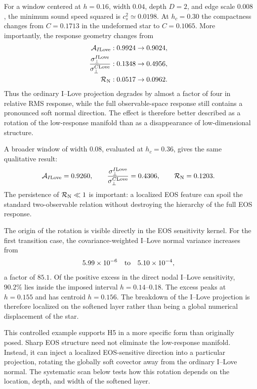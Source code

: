 For a window centered at \(h=0.16\), width \(0.04\), depth \(D=2\), and
edge scale \(0.008\), the minimum sound speed squared is
\(c_s^2\simeq0.0198\).  At \(h_c=0.30\) the compactness changes from
\(C=0.1713\) in the undeformed star to \(C=0.1065\).  More importantly, the
response geometry changes from
\begin{align}
 {\cal A}_{I{\rm Love}}
 &:
 0.9924\rightarrow0.9024,
 \\
 \frac{\sigma_\perp^{I{\rm Love}}}
      {\sigma_\perp^{C{\rm Love}}}
 &:
 0.1348\rightarrow0.4956,
 \\
 \mathcal R_{\rm N}
 &:
 0.0517\rightarrow0.0962.
 \label{eq:transition-rotation}
\end{align}
Thus the ordinary I--Love projection degrades by almost a factor of four in
relative RMS response, while the full observable-space response still
contains a pronounced soft normal direction.  The effect is therefore better
described as a rotation of the low-response manifold than as a disappearance
of low-dimensional structure.

A broader window of width \(0.08\), evaluated at \(h_c=0.36\), gives the same
qualitative result:
\[
 {\cal A}_{I{\rm Love}}=0.9260,
 \qquad
 \frac{\sigma_\perp^{I{\rm Love}}}
      {\sigma_\perp^{C{\rm Love}}}=0.4306,
 \qquad
 \mathcal R_{\rm N}=0.1203.
\]
The persistence of \(\mathcal R_{\rm N}\ll1\) is important: a localized EOS
feature can spoil the standard two-observable relation without destroying
the hierarchy of the full EOS response.

The origin of the rotation is visible directly in the EOS sensitivity
kernel.  For the first transition case, the covariance-weighted I--Love
normal variance increases from
\[
 5.99\times10^{-6}
 \quad\hbox{to}\quad
 5.10\times10^{-4},
\]
a factor of \(85.1\).  Of the positive excess in the direct nodal
I--Love sensitivity, \(90.2\%\) lies inside the imposed interval
\(h=0.14\)--0.18.  The excess peaks at \(h=0.155\) and has centroid
\(h=0.156\).  The breakdown of the I--Love projection is therefore localized
on the softened layer rather than being a global numerical displacement of
the star.

This controlled example supports H5 in a more specific form than originally
posed.  Sharp EOS structure need not eliminate the low-response manifold.
Instead, it can inject a localized EOS-sensitive direction into a particular
projection, rotating the globally soft covector away from the ordinary
I--Love normal.  The systematic scan below tests how this rotation depends on
the location, depth, and width of the softened layer.

